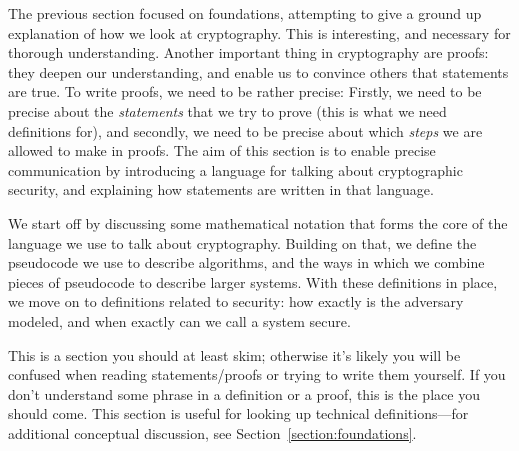 The previous section focused on foundations, attempting to give a ground up explanation of how we look at cryptography. This is interesting, and necessary for thorough understanding. Another important thing in cryptography are proofs: they deepen our understanding, and enable us to convince others that statements are true. To write proofs, we need to be rather precise: Firstly, we need to be precise about the \emph{statements} that we try to prove (this is what we need definitions for), and secondly, we need to be precise about which \emph{steps} we are allowed to make in proofs. The aim of this section is to enable precise communication by introducing a language for talking about cryptographic security, and explaining how statements are written in that language.

We start off by discussing some mathematical notation that forms the core of the language we use to talk about cryptography. Building on that, we define the pseudocode we use to describe algorithms, and the ways in which we combine pieces of pseudocode to describe larger systems. With these definitions in place, we move on to definitions related to security: how exactly is the adversary modeled, and when exactly can we call a system secure.

This is a section you should at least skim; otherwise it's likely you will be confused when reading statements/proofs or trying to write them yourself. If you don't understand some phrase in a definition or a proof, this is the place you should come. This section is useful for looking up technical definitions---for additional conceptual discussion, see Section~\ref{section:foundations}.